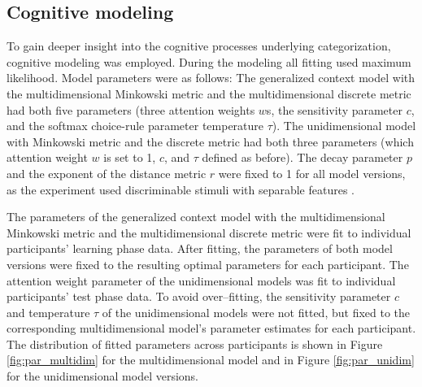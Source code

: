 \documentclass[a4paper,man,natbib]{apa6}
\begin{document}
\subsection{Cognitive modeling}
To gain deeper insight into the cognitive processes underlying categorization, cognitive modeling was employed. During the modeling all fitting used maximum likelihood. Model parameters were as follows: The generalized context model with the multidimensional Minkowski metric and the multidimensional discrete metric had both five parameters (three attention weights $w$s, the sensitivity parameter $c$, and the softmax choice-rule parameter temperature $\tau$). The unidimensional model with Minkowski metric and the discrete metric had both three parameters (which attention weight $w$ is set to 1, $c$, and $\tau$ defined as before). The decay parameter $p$ and the exponent of the distance metric $r$ were fixed to 1 for all model versions, as the experiment used discriminable stimuli with separable features \citep{ennis1988confusable, nosofsky1985luce, shepard1964attention, garner1974processing}. 

The parameters of the generalized context model with the multidimensional Minkowski metric and the multidimensional discrete metric were fit to individual participants’ learning phase data. After fitting, the parameters of both model versions were fixed to the resulting optimal parameters for each participant. The attention weight parameter of the unidimensional models was fit to individual participants’ test phase data. To avoid over--fitting, the sensitivity parameter $c$ and temperature $\tau$ of the unidimensional models were not fitted, but fixed to the corresponding multidimensional model’s parameter estimates for each participant. The distribution of fitted parameters across participants is shown in Figure \ref{fig:par_multidim} for the multidimensional model and in Figure \ref{fig:par_unidim} for the unidimensional model versions. 
\end{document}
